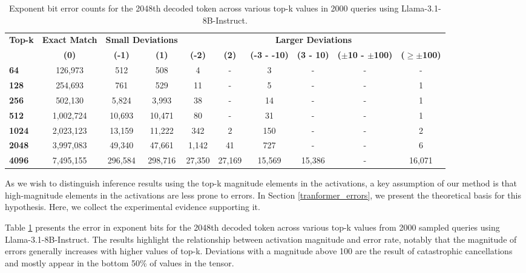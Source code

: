 \documentclass{article}
\theoremstyle{plain}
\theoremstyle{definition}
\theoremstyle{remark}
\begin{document}
\begin{table}[ht]
\caption{Exponent bit error counts for the 2048th decoded token across various top-k values in 2000 queries using Llama-3.1-8B-Instruct.}
\label{tab:exponent_errors}
\vskip 0.15in
\begin{center}
\begin{small}
\begin{tabular}{@{}lccccccccc@{}}
\toprule
\multirow{2}{*}{\textbf{Top-k}} & \multicolumn{1}{c}{\textbf{Exact Match}} & \multicolumn{2}{c}{\textbf{Small Deviations}} & \multicolumn{6}{c}{\textbf{Larger Deviations}} \\ 
\cmidrule(lr){2-2} \cmidrule(lr){3-4} \cmidrule(lr){5-10}
 & \textbf{(0)}  & \textbf{(-1)} & \textbf{(1)} & \textbf{(-2)} & \textbf{(2)} & \textbf{(-3 - -10)} & \textbf{(3 - 10)} & \textbf{($\pm$10 - $\pm$100)} & \textbf{($\geq\pm$100)} \\ \midrule
 \textbf{64} & 126,973 & 512 & 508 & 4 & - & 3 & - & - & - \\ 
\textbf{128} & 254,693 & 761 & 529 & 11 & - & 5 & - & - & 1 \\ 
\textbf{256} & 502,130 & 5,824 & 3,993 & 38 & - & 14 & - & - & 1 \\ 
\textbf{512} & 1,002,724 & 10,693 & 10,471 & 80 & - & 31 & - & - & 1 \\ 
\textbf{1024} & 2,023,123 & 13,159 & 11,222 & 342 & 2 & 150 & - & - & 2 \\ 
\textbf{2048} & 3,997,083 & 49,340 & 47,661 & 1,142 & 41 & 727 & - & - & 6 \\ 
\textbf{4096} & 7,495,155 & 296,584 & 298,716 & 27,350 & 27,169 & 15,569 & 15,386 & - & 16,071 \\ 
\bottomrule
\end{tabular}
\end{small}
\end{center}
\vskip -0.1in
\end{table}

As we wish to distinguish inference results using the top-k magnitude elements in the activations, a key assumption of our method is that high-magnitude elements in the activations are less prone to errors. 
In Section \ref{tranformer_errors}, we present the theoretical basis for this hypothesis. 
Here, we collect the experimental evidence supporting it.

Table \ref{tab:exponent_errors} presents the error in exponent bits for the 2048th decoded token across various top-k values from 2000 sampled queries using Llama-3.1-8B-Instruct.
The results highlight the relationship between activation magnitude and error rate, notably that the magnitude of errors generally increases with higher values of top-k.
Deviations with a magnitude above 100 are the result of catastrophic cancellations and mostly appear in the bottom 50\% of values in the tensor.
\end{document}
